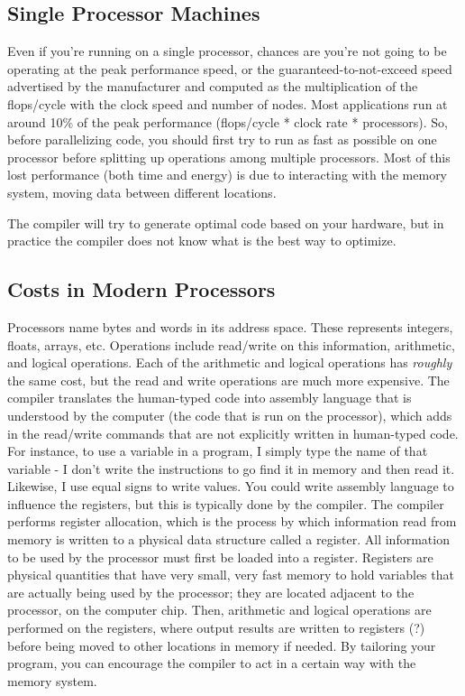 \documentclass[10pt]{article}
\begin{document}
\begin{flushleft}
\section{Single Processor Machines}
 
Even if you're running on a single processor, chances are you're not going to be operating at the peak performance speed, or the guaranteed-to-not-exceed speed advertised by the manufacturer and computed as the multiplication of the flops/cycle with the clock speed and number of nodes. Most applications run at around 10\% of the peak performance (flops/cycle * clock rate * processors). So, before parallelizing code, you should first try to run as fast as possible on one processor before splitting up operations among multiple processors. Most of this lost performance (both time and energy) is due to interacting with the memory system, moving data between different locations. 

The compiler will try to generate optimal code based on your hardware, but in practice the compiler does not know what is the best way to optimize. 

\subsection{Costs in Modern Processors}

Processors name bytes and words in its address space. These represents integers, floats, arrays, etc. Operations include read/write on this information, arithmetic, and logical operations. Each of the arithmetic and logical operations has \textit{roughly} the same cost, but the read and write operations are much more expensive. The compiler translates the human-typed code into assembly language that is understood by the computer (the code that is run on the processor), which adds in the read/write commands that are not explicitly written in human-typed code. For instance, to use a variable in a program, I simply type the name of that variable - I don't write the instructions to go find it in memory and then read it. Likewise, I use equal signs to write values. You could write assembly language to influence the registers, but this is typically done by the compiler. The compiler performs register allocation, which is the process by which information read from memory is written to a physical data structure called a register. All information to be used by the processor must first be loaded into a register. Registers are physical quantities that have very small, very fast memory to hold variables that are actually being used by the processor; they are located adjacent to the processor, on the computer chip. Then, arithmetic and logical operations are performed on the registers, where output results are written to registers (?) before being moved to other locations in memory if needed. By tailoring your program, you can encourage the compiler to act in a certain way with the memory system.


\end{flushleft}
\end{document}
